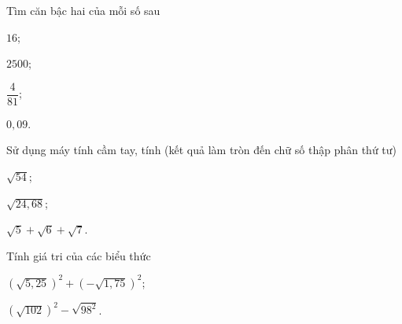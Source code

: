 \begin{bt}
	Tìm căn bậc hai của mỗi số sau
	\begin{listEX}[4]
	\item $16$;
	\item $2500$;
	\item $\dfrac{4}{81}$;
	\item $0{,}09$.
	\end{listEX}
\end{bt}
\begin{bt}
	Sử dụng máy tính cầm tay, tính (kết quả làm tròn đến chữ số thập phân thứ tư)
	\begin{listEX}[3]
	\item $\sqrt{54}$;
	\item $\sqrt{24{,}68}$;
	\item $\sqrt{5}+\sqrt{6}+\sqrt{7}$.
	\end{listEX}
\end{bt}
\begin{bt}
	Tính giá tri của các biểu thức
	\begin{listEX}[2]
	\item $(\sqrt{5,25})^{2}+(-\sqrt{1,75})^{2}$;
	\item $(\sqrt{102})^{2}-\sqrt{98^{2}}$.
	\end{listEX}
\end{bt}
